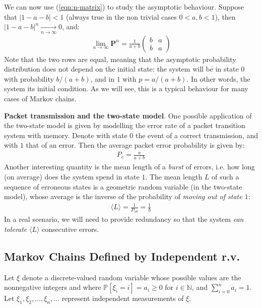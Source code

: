 \documentclass[../template.tex]{subfiles}
\begin{document}
We can now use (\ref{eqn:n-matrix}) to study the asymptotic behaviour. Suppose that $|1-a-b|<1$ (always true in the non trivial cases $0<a,b<1$), then $|1-a-b|^n  \xrightarrow[n \to \infty]{}  0$, and:
\begin{align*}
    \lim_{n \to \infty} \textbf{P}^n = \frac{1}{a+b} \left(\begin{array}{cc}
    b & a \\ 
    b & a
    \end{array}\right) 
\end{align*}
Note that the two rows are equal, meaning that the asymptotic probability distribution does not depend on the initial state: the system will be in state $0$ with probability $b/(a+b)$, and in $1$ with $p=a/(a+b)$. In other words, the system  its initial condition. As we will see, this is a typical behaviour for many cases of Markov chains. 

\begin{appr}
    \textbf{Packet transmission and the two-state model}. One possible application of the two-state model is given by modelling the error rate of a packet transition system with memory. Denote with state $0$ the event of a correct transmission, and with $1$ that of an error. Then the average packet error probability is given by:
    \begin{align*}
        P_e = \frac{a}{a+b} 
    \end{align*}
    Another interesting quantity is the mean length of a \textit{burst} of errors, i.e. how long (on average) does the system spend in state $1$. The mean length $L$ of such a sequence of erroneous states is a geometric random variable (in the two-state model), whose average is the inverse of the probability of \textit{moving out of state $1$}:
    \begin{align*}
        \langle L \rangle = \frac{1}{P_{10}} = \frac{1}{b} 
    \end{align*} 
    In a real scenario, we will need to provide redundancy so that the system \textit{can tolerate} $\langle L \rangle$ consecutive errors.
\end{appr}

\subsection{Markov Chains Defined by Independent r.v.}
Let $\xi$ denote a discrete-valued random variable whose possible values are the nonnegative integers and where $\mathbb{P}[\xi_i = i] = a_i \geq 0$ for $i\in \mathbb{N}$, and $\sum_{i=0}^n a_i = 1$. Let $\xi_1, \xi_2, \dots, \xi_n, \dots$ represent independent measurements of $\xi$.
\end{document}
